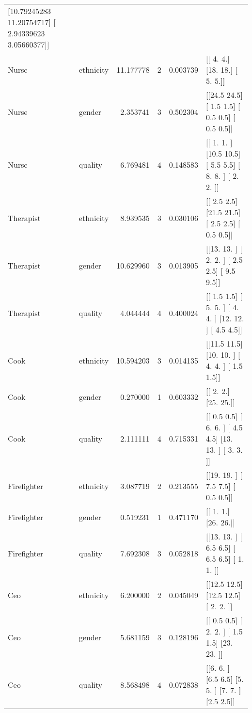 \begin{tabular}{llrrrl}
 [10.79245283 11.20754717]
 [ 2.94339623  3.05660377]] \\
Nurse   & ethnicity & 11.177778 & 2 & 0.003739 & [[ 4.  4.]
 [18. 18.]
 [ 5.  5.]] \\
Nurse   & gender & 2.353741 & 3 & 0.502304 & [[24.5 24.5]
 [ 1.5  1.5]
 [ 0.5  0.5]
 [ 0.5  0.5]] \\
Nurse   & quality & 6.769481 & 4 & 0.148583 & [[ 1.   1. ]
 [10.5 10.5]
 [ 5.5  5.5]
 [ 8.   8. ]
 [ 2.   2. ]] \\
Therapist  & ethnicity & 8.939535 & 3 & 0.030106 & [[ 2.5  2.5]
 [21.5 21.5]
 [ 2.5  2.5]
 [ 0.5  0.5]] \\
Therapist  & gender & 10.629960 & 3 & 0.013905 & [[13.  13. ]
 [ 2.   2. ]
 [ 2.5  2.5]
 [ 9.5  9.5]] \\
Therapist  & quality & 4.044444 & 4 & 0.400024 & [[ 1.5  1.5]
 [ 5.   5. ]
 [ 4.   4. ]
 [12.  12. ]
 [ 4.5  4.5]] \\
Cook  & ethnicity & 10.594203 & 3 & 0.014135 & [[11.5 11.5]
 [10.  10. ]
 [ 4.   4. ]
 [ 1.5  1.5]] \\
Cook  & gender & 0.270000 & 1 & 0.603332 & [[ 2.  2.]
 [25. 25.]] \\
Cook  & quality & 2.111111 & 4 & 0.715331 & [[ 0.5  0.5]
 [ 6.   6. ]
 [ 4.5  4.5]
 [13.  13. ]
 [ 3.   3. ]] \\
Firefighter  & ethnicity & 3.087719 & 2 & 0.213555 & [[19.  19. ]
 [ 7.5  7.5]
 [ 0.5  0.5]] \\
Firefighter  & gender & 0.519231 & 1 & 0.471170 & [[ 1.  1.]
 [26. 26.]] \\
Firefighter  & quality & 7.692308 & 3 & 0.052818 & [[13.  13. ]
 [ 6.5  6.5]
 [ 6.5  6.5]
 [ 1.   1. ]] \\
Ceo  & ethnicity & 6.200000 & 2 & 0.045049 & [[12.5 12.5]
 [12.5 12.5]
 [ 2.   2. ]] \\
Ceo  & gender & 5.681159 & 3 & 0.128196 & [[ 0.5  0.5]
 [ 2.   2. ]
 [ 1.5  1.5]
 [23.  23. ]] \\
Ceo  & quality & 8.568498 & 4 & 0.072838 & [[6.  6. ]
 [6.5 6.5]
 [5.  5. ]
 [7.  7. ]
 [2.5 2.5]] \\
\bottomrule
\end{tabular}
